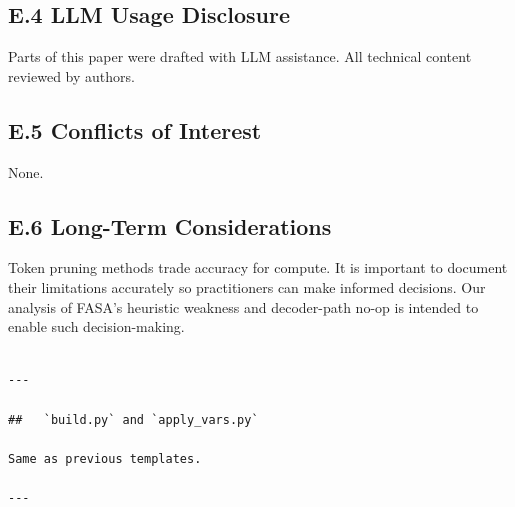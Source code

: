 \subsection{E.4 LLM Usage Disclosure}

Parts of this paper were drafted with LLM assistance. All technical content 
reviewed by authors.

\subsection{E.5 Conflicts of Interest}

None.

\subsection{E.6 Long-Term Considerations}

Token pruning methods trade accuracy for compute. It is important to 
document their limitations accurately so practitioners can make informed 
decisions. Our analysis of FASA's heuristic weakness and decoder-path 
no-op is intended to enable such decision-making.
\begin{lstlisting}

---

##   `build.py` and `apply_vars.py`

Same as previous templates.

---
\end{lstlisting}